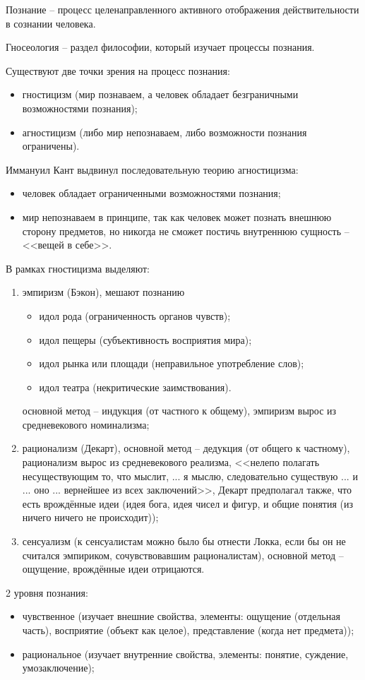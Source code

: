 
Познание -- процесс целенаправленного активного отображения действительности в сознании человека.

Гносеология -- раздел философии, который изучает процессы познания.

Существуют две точки зрения на процесс познания:
\begin{itemize}
	\item гностицизм (мир познаваем, а человек обладает безграничными возможностями познания);
	\item агностицизм (либо мир непознаваем, либо возможности познания ограничены).
\end{itemize}

Иммануил Кант выдвинул последовательную теорию агностицизма:
\begin{itemize}
	\item человек обладает ограниченными возможностями познания;
	\item мир непознаваем в принципе, так как человек может познать внешнюю сторону предметов, но никогда не сможет постичь внутреннюю сущность -- <<вещей в себе>>.
\end{itemize}

В рамках гностицизма выделяют:
\begin{enumerate}
	\item эмпиризм (Бэкон), мешают познанию
	\begin{itemize}
		\item идол рода (ограниченность органов чувств);
		\item идол пещеры (субъективность восприятия мира);
		\item идол рынка или площади (неправильное употребление слов);
		\item идол театра (некритические заимствования).
	\end{itemize}
	основной метод -- индукция (от частного к общему),  эмпиризм вырос из средневекового номинализма;
	\item рационализм (Декарт),
	основной метод -- дедукция (от общего к частному),  рационализм вырос из средневекового реализма,
	<<нелепо полагать несуществующим то, что мыслит, ... я мыслю, следовательно существую ... и ... оно ... вернейшее из всех заключений>>, Декарт предполагал также, что есть врождённые идеи (идея бога, идея чисел и фигур, и общие понятия (из ничего ничего не происходит)); 
	\item сенсуализм (к сенсуалистам можно было бы отнести Локка, если бы он не считался эмпириком, сочувствовавшим рационалистам), основной метод -- ощущение, врождённые идеи отрицаются. 
\end{enumerate} 

2 уровня познания:

\begin{itemize}
	\item чувственное (изучает внешние свойства, элементы: ощущение (отдельная часть), восприятие (объект как целое), представление (когда нет предмета));
	\item рациональное (изучает внутренние свойства, элементы: понятие, суждение, умозаключение);
\end{itemize}
